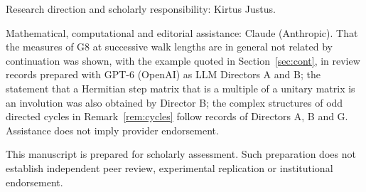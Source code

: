 \documentclass[11pt,a4paper]{article}
\begin{document}
\begin{titlepage}
\vfill
{\small Research direction and scholarly responsibility: Kirtus Justus.\par
Mathematical, computational and editorial assistance: Claude (Anthropic).
That the measures of G8 at successive walk lengths are in general not related by continuation was shown, with the example quoted in Section~\ref{sec:cont}, in review records prepared with GPT-6 (OpenAI) as LLM Directors A and B; the statement that a Hermitian step matrix that is a multiple of a unitary matrix is an involution was also obtained by Director B; the complex structures of odd directed cycles in Remark~\ref{rem:cycles} follow records of Directors A, B and G.
Assistance does not imply provider endorsement.\par
This manuscript is prepared for scholarly assessment. Such preparation does not establish independent peer review,
experimental replication or institutional endorsement.\par}
\end{titlepage}
\setcounter{page}{2}

\clearpage
\end{document}
